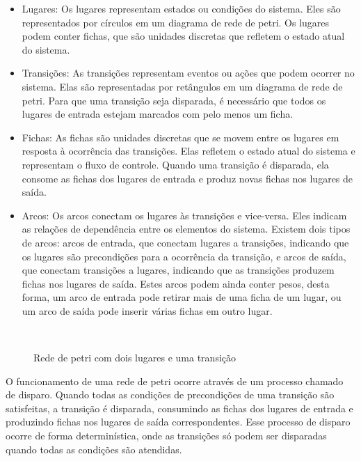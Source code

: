 \begin{itemize}
	\item Lugares: Os lugares representam estados ou condições do sistema. Eles são representados por círculos em um diagrama de rede de petri. Os lugares podem conter fichas, que são unidades discretas que refletem o estado atual do sistema.
	
	\item Transições: As transições representam eventos ou ações que podem ocorrer no sistema. Elas são representadas por retângulos em um diagrama de rede de petri. Para que uma transição seja disparada, é necessário que todos os lugares de entrada estejam marcados com pelo menos um ficha.
	
	\item Fichas: As fichas são unidades discretas que se movem entre os lugares em resposta à ocorrência das transições. Elas refletem o estado atual do sistema e representam o fluxo de controle. Quando uma transição é disparada, ela consome as fichas dos lugares de entrada e produz novas fichas nos lugares de saída.
	
	\item Arcos: Os arcos conectam os lugares às transições e vice-versa. Eles indicam as relações de dependência entre os elementos do sistema. Existem dois tipos de arcos: arcos de entrada, que conectam lugares a transições, indicando que os lugares são precondições para a ocorrência da transição, e arcos de saída, que conectam transições a lugares, indicando que as transições produzem fichas nos lugares de saída. Estes arcos podem ainda conter pesos, desta forma, um arco de entrada pode retirar mais de uma ficha de um lugar, ou um arco de saída pode inserir várias fichas em outro lugar.
\end{itemize}

\begin{figure}[ht]
	\centering
	\caption{Rede de petri com dois lugares e uma transição}
	\\
	\label{fig:samplepetri}
\end{figure}

\pagebreak

O funcionamento de uma rede de petri ocorre através de um processo chamado de disparo. Quando todas as condições de precondições de uma transição são satisfeitas, a transição é disparada, consumindo as fichas dos lugares de entrada e produzindo fichas nos lugares de saída correspondentes. Esse processo de disparo ocorre de forma determinística, onde as transições só podem ser disparadas quando todas as condições são atendidas.


